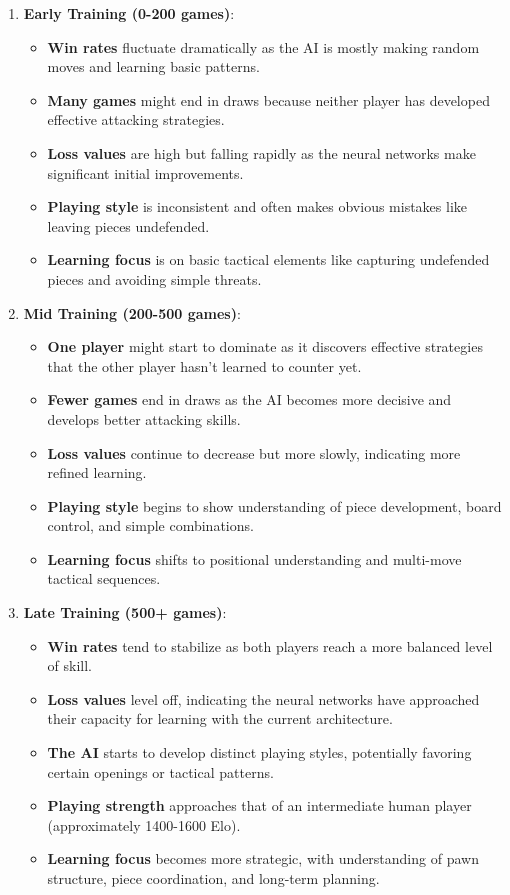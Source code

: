 \documentclass[11pt]{article}
\begin{document}
\begin{enumerate}
    \item \textbf{Early Training (0-200 games)}:
    \begin{itemize}
        \item \textbf{Win rates} fluctuate dramatically as the AI is mostly making random moves and learning basic patterns.
        \item \textbf{Many games} might end in draws because neither player has developed effective attacking strategies.
        \item \textbf{Loss values} are high but falling rapidly as the neural networks make significant initial improvements.
        \item \textbf{Playing style} is inconsistent and often makes obvious mistakes like leaving pieces undefended.
        \item \textbf{Learning focus} is on basic tactical elements like capturing undefended pieces and avoiding simple threats.
    \end{itemize}
    
    \item \textbf{Mid Training (200-500 games)}:
    \begin{itemize}
        \item \textbf{One player} might start to dominate as it discovers effective strategies that the other player hasn't learned to counter yet.
        \item \textbf{Fewer games} end in draws as the AI becomes more decisive and develops better attacking skills.
        \item \textbf{Loss values} continue to decrease but more slowly, indicating more refined learning.
        \item \textbf{Playing style} begins to show understanding of piece development, board control, and simple combinations.
        \item \textbf{Learning focus} shifts to positional understanding and multi-move tactical sequences.
    \end{itemize}
    
    \item \textbf{Late Training (500+ games)}:
    \begin{itemize}
        \item \textbf{Win rates} tend to stabilize as both players reach a more balanced level of skill.
        \item \textbf{Loss values} level off, indicating the neural networks have approached their capacity for learning with the current architecture.
        \item \textbf{The AI} starts to develop distinct playing styles, potentially favoring certain openings or tactical patterns.
        \item \textbf{Playing strength} approaches that of an intermediate human player (approximately 1400-1600 Elo).
        \item \textbf{Learning focus} becomes more strategic, with understanding of pawn structure, piece coordination, and long-term planning.
    \end{itemize}
\end{enumerate}
\end{document}
